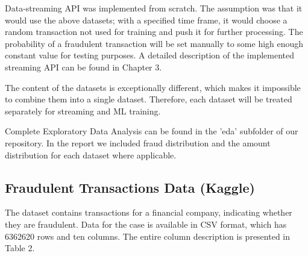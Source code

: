 \documentclass[12pt,a4paper, hidelinks]{article}
\begin{document}
Data-streaming API was implemented from scratch. The assumption was that it would use the above datasets; with a specified time frame, it would choose a random transaction not used for training and push it for further processing. The probability of a fraudulent transaction will be set manually to some high enough constant value for testing purposes. A detailed description of the implemented streaming API can be found in Chapter 3.

The content of the datasets is exceptionally different, which makes it impossible to combine them into a single dataset. Therefore, each dataset will be treated separately for streaming and ML training.

Complete Exploratory Data Analysis can be found in the 'eda' subfolder of our repository. In the report we included fraud distribution and the amount distribution for each dataset where applicable.


\subsection{Fraudulent Transactions Data (Kaggle)}

The dataset contains transactions for a financial company, indicating whether they are fraudulent. Data for the case is available in CSV format, which has 6362620 rows and ten columns. The entire column description is presented in Table 2.
\end{document}
